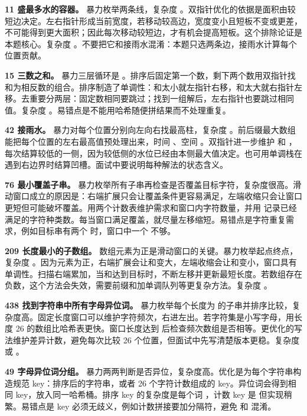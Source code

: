 \textbf{11 盛最多水的容器。} 暴力枚举两条线，复杂度 。双指针优化的依据是面积由较短边决定。左右指针形成当前宽度，若移动较高边，宽度变小且短板不变或更差，不可能得到更大面积；因此每次移动较短边，才有机会提高短板。这个排除论证是本题核心。复杂度 。不要把它和接雨水混淆：本题只选两条边，接雨水计算每个位置贡献。

\textbf{15 三数之和。} 暴力三层循环是 。排序后固定第一个数，剩下两个数用双指针找和为相反数的组合。排序制造了单调性：和太小就左指针右移，和太大就右指针左移。去重要分两层：固定数相同要跳过；找到一组解后，左右指针也要跳过相同值。复杂度 。易错点是不能用哈希随便拼结果而不处理重复。

\textbf{42 接雨水。} 暴力对每个位置分别向左向右找最高柱，复杂度 。前后缀最大数组能把每个位置的左右最高值预处理出来，时间 、空间 。双指针进一步维护  和 ，每次结算较低的一侧，因为较低侧的水位已经由本侧最大值决定。也可用单调栈在遇到右边界时结算凹槽。面试中要说明每种解法的状态含义。

\textbf{76 最小覆盖子串。} 暴力枚举所有子串再检查是否覆盖目标字符，复杂度很高。滑动窗口成立的原因是：右端扩展只会让覆盖条件更容易满足，左端收缩只会让窗口更短但可能破坏覆盖。用两个计数表维护需求和窗口内字符数量，并用  记录已经满足的字符种类数。每当窗口满足覆盖，就尽量左移缩短。易错点是字符重复需求，例如目标串有两个  时，窗口中一个  不够。

\textbf{209 长度最小的子数组。} 数组元素为正是滑动窗口的关键。暴力枚举起点终点，复杂度 。因为元素为正，右端扩展会让和变大，左端收缩会让和变小，窗口具有单调性。扫描右端累加，当和达到目标时，不断左移并更新最短长度。若数组存在负数，这个方法会失效，需要前缀和加单调队列等更复杂方法。复杂度 。

\textbf{438 找到字符串中所有字母异位词。} 暴力枚举每个长度为  的子串并排序比较，复杂度高。固定长度窗口可以维护字符频次，右进左出。若字符集是小写字母，用长度 26 的数组比哈希表更快。窗口长度达到  后检查频次数组是否相等。更优化的写法维护差异计数，避免每次比较 26 个位置，但面试中先写清楚版本更稳。复杂度  或 。

\textbf{49 字母异位词分组。} 暴力两两判断是否异位，复杂度高。优化是为每个字符串构造规范 key：排序后的字符串，或者 26 个字符计数组成的 key。异位词会得到相同 key，放入同一哈希桶。排序 key 的复杂度是每个词 ，计数 key 是  但实现稍繁。易错点是 key 必须无歧义，例如计数拼接要加分隔符，避免  和  混淆。

